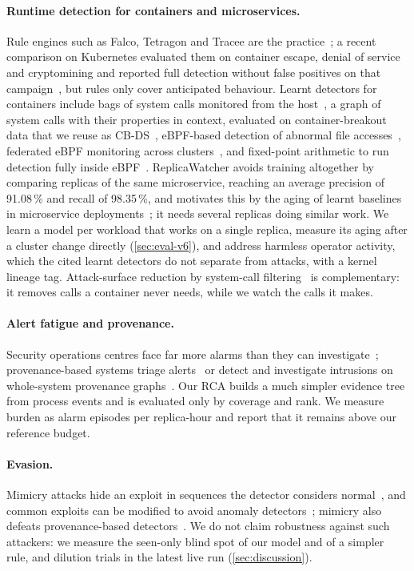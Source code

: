 \paragraph{Runtime detection for containers and microservices.} Rule engines such as Falco, Tetragon and Tracee are the
practice~\cite{falco,tetragon,tracee}; a recent comparison on Kubernetes evaluated them on container escape, denial of
service and cryptomining and reported full detection without false positives on that campaign~\cite{syairozi2025}, but
rules only cover anticipated behaviour. Learnt detectors for containers include bags of system calls monitored from the
host~\cite{abed2016}, a graph of system calls with their properties in context, evaluated on container-breakout data
that we reuse as CB-DS~\cite{elkhairi2022}, eBPF-based detection of abnormal file accesses~\cite{zhou2026},
federated eBPF monitoring across clusters~\cite{zehra2025}, and fixed-point arithmetic to run detection fully inside
eBPF~\cite{osaki2024}. ReplicaWatcher avoids training altogether by comparing replicas of the same microservice,
reaching an average precision of 91.08\,\% and recall of 98.35\,\%, and motivates this by the aging of learnt
baselines in microservice deployments~\cite{elkhairi2024}; it needs several replicas doing similar work. We learn a
model per workload that works on a single replica, measure its aging after a cluster change directly
(\cref{sec:eval-v6}), and address harmless operator activity, which the cited learnt detectors do not separate from
attacks, with a kernel lineage tag. Attack-surface reduction by system-call filtering~\cite{ghavamnia2020a,
ghavamnia2020b} is complementary: it removes calls a container never needs, while we watch the calls it makes.

\paragraph{Alert fatigue and provenance.} Security operations centres face far more alarms than they can
investigate~\cite{alahmadi2022}; provenance-based systems triage alerts~\cite{hassan2019} or detect and investigate
intrusions on whole-system provenance graphs~\cite{cheng2023,jiang2025}. Our RCA builds a much simpler evidence tree
from process events and is evaluated only by coverage and rank. We measure burden as alarm episodes per replica-hour and
report that it remains above our reference budget.

\paragraph{Evasion.} Mimicry attacks hide an exploit in sequences the detector considers normal~\cite{wagner2002}, and
common exploits can be modified to avoid anomaly detectors~\cite{tan2002}; mimicry also defeats provenance-based
detectors~\cite{goyal2023}. We do not claim robustness against such attackers: we measure the seen-only blind spot of our
model and of a simpler rule, and dilution trials in the latest live run (\cref{sec:discussion}).

